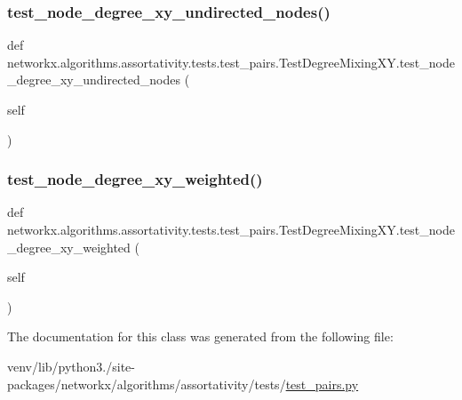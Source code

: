 \subsubsection{\texorpdfstring{test\+\_\+node\+\_\+degree\+\_\+xy\+\_\+undirected\+\_\+nodes()}{test\_node\_degree\_xy\_undirected\_nodes()}}
{\footnotesize\ttfamily def networkx.\+algorithms.\+assortativity.\+tests.\+test\+\_\+pairs.\+Test\+Degree\+Mixing\+X\+Y.\+test\+\_\+node\+\_\+degree\+\_\+xy\+\_\+undirected\+\_\+nodes (\begin{DoxyParamCaption}\item[{}]{self }\end{DoxyParamCaption})}

\mbox{\label{classnetworkx_1_1algorithms_1_1assortativity_1_1tests_1_1test__pairs_1_1TestDegreeMixingXY_af8e2126af2b5dfc502610d1cd779bcd2}} 
\subsubsection{\texorpdfstring{test\+\_\+node\+\_\+degree\+\_\+xy\+\_\+weighted()}{test\_node\_degree\_xy\_weighted()}}
{\footnotesize\ttfamily def networkx.\+algorithms.\+assortativity.\+tests.\+test\+\_\+pairs.\+Test\+Degree\+Mixing\+X\+Y.\+test\+\_\+node\+\_\+degree\+\_\+xy\+\_\+weighted (\begin{DoxyParamCaption}\item[{}]{self }\end{DoxyParamCaption})}



The documentation for this class was generated from the following file\+:\begin{DoxyCompactItemize}
\item 
venv/lib/python3./site-\/packages/networkx/algorithms/assortativity/tests/\hyperlink{test__pairs_8py}{test\+\_\+pairs.\+py}\end{DoxyCompactItemize}
